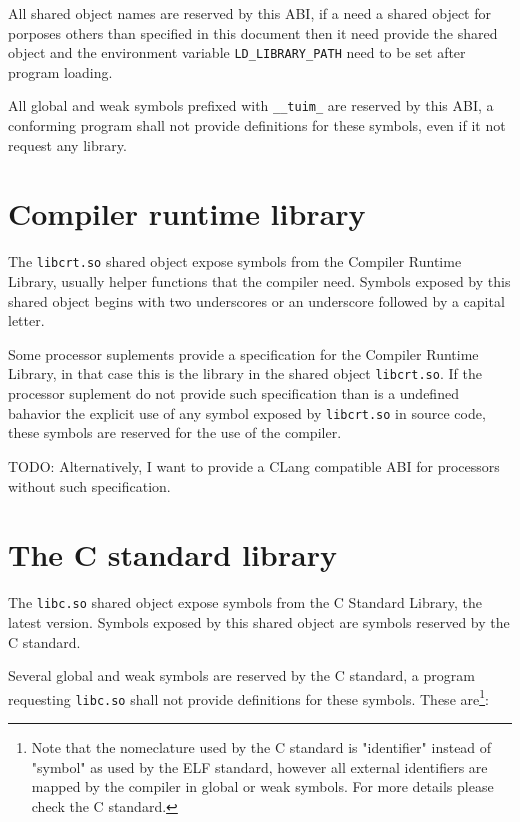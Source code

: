 \documentclass[
   12pt,                         %
   openright,                    %
   twoside,                      %
   a4paper,                      %
   sumario = tradicional,        %
   english,                      %
   xcolor=table                  %
]{abntex2}
\begin{document}
All shared object names are reserved by this ABI,
if a  need a shared object for porposes others than
specified in this document then it need provide the shared object and
the environment variable \texttt{LD\_LIBRARY\_PATH} need to be set
after program loading.

All global and weak symbols prefixed with \texttt{\_\_tuim\_}
are reserved by this ABI,
a conforming program shall not provide definitions for these symbols,
even if it not request any library.

\section{Compiler runtime library}

The \texttt{libcrt.so} shared object
expose symbols from the Compiler Runtime Library,
usually helper functions that the compiler need.
Symbols exposed by this shared object
begins with two underscores or an underscore followed by a capital letter.

Some processor suplements provide a specification for the
Compiler Runtime Library, in that case this is the library in the shared
object \texttt{libcrt.so}.
If the processor suplement do not provide such specification than
is a undefined bahavior the explicit use of
any symbol exposed by \texttt{libcrt.so} in source code,
these symbols are reserved for the use of the compiler.

TODO: Alternatively, I want to provide a CLang compatible ABI for processors
without such specification.

\section{The C standard library}

The \texttt{libc.so} shared object
expose symbols from the C Standard Library, the latest version\cite{ISO9899}.
Symbols exposed by this shared object are symbols reserved by the C standard.

Several global and weak symbols
are reserved by the C standard,
a program requesting \texttt{libc.so}
shall not provide definitions for these symbols.
These are\footnote{%
   Note that the nomeclature used by the C standard is
   "identifier" instead of "symbol" as used by the ELF standard,
   however all external identifiers are mapped by the compiler in
   global or weak symbols.
   For more details please check the C standard\cite{ISO9899}.
}:
\end{document}
